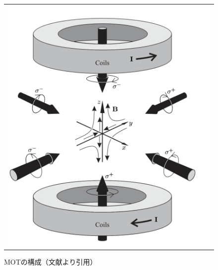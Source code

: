 \documentclass[uplatex, dvipdfmx, a4paper, report, papersize, 11pt]{jsbook}
\begin{document}
\begin{figure}[htpb]
  \centering
    \begin{tabular}{c}


      \begin{minipage}{0.50\hsize}
        \centering
          \includegraphics[keepaspectratio,  scale=0.35,  angle=0]
                          {figures/chapter2/MOT_circular_polarization.png}
                          \caption{MOTの構成（文献\cite{Foot:1080846}より引用）}
                          \label{MOT_circular_polarization}
      \end{minipage}



\end{tabular}
\end{figure}
\end{document}
